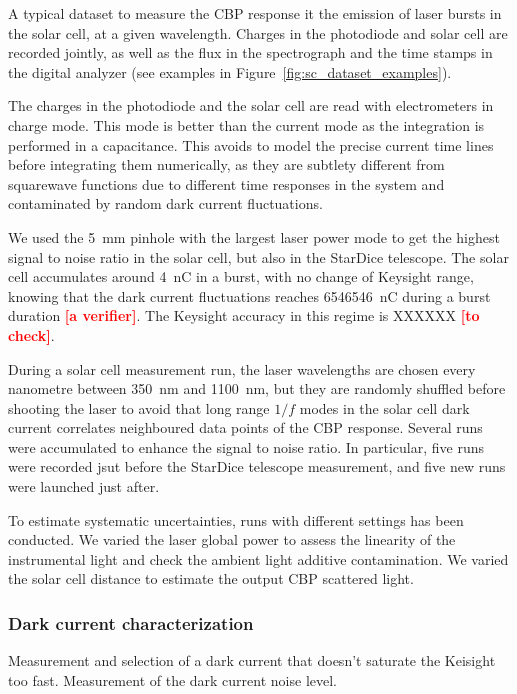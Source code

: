 \documentclass[onecolumn]{aa}
\newcommand{\SD}{StarDice }
\newcommand{\todo}[1]{\textbf{\textcolor{red}{[#1]}}\xspace}
\begin{document}
A typical dataset to measure the CBP response it the emission of laser bursts in the solar cell, at a given wavelength. Charges in the photodiode and solar cell are recorded jointly, as well as the flux in the spectrograph and the time stamps in the digital analyzer (see examples in Figure~\ref{fig:sc_dataset_examples}).

The charges in the photodiode and the solar cell are read with electrometers in charge mode. This mode is better than the current mode as the integration is performed in a capacitance. This avoids to model the precise current time lines before integrating them numerically, as they are subtlety different from squarewave functions due to different time responses in the system and contaminated by random dark current fluctuations. 

We used the \SI{5}{\mm} pinhole with the largest laser power mode to get the highest signal to noise ratio in the solar cell, but also in the \SD telescope. The solar cell accumulates around \SI{4}{\nano\coulomb} in a burst, with no change of Keysight range, knowing that the dark current fluctuations reaches \SI{6546546}{\nano\coulomb} during a burst duration \todo{a verifier}. The Keysight accuracy in this regime is XXXXXX \todo{to check}. 


During a solar cell measurement run, the laser wavelengths are chosen every nanometre between \SI{350}{\nano\meter} and \SI{1100}{\nano\meter}, but they are randomly shuffled before shooting the laser to avoid that long range $1/f$ modes in the solar cell dark current correlates neighboured data points of the CBP response. Several runs were accumulated to enhance the signal to noise ratio. In particular, five runs were recorded jsut before the \SD telescope measurement, and five new runs were launched just after.


To estimate systematic uncertainties, runs with different settings has been conducted. We varied the laser global power to assess the linearity of the instrumental light and check the ambient light additive contamination. We varied the solar cell distance to estimate the output CBP scattered light.


\subsubsection{Dark current characterization}

Measurement and selection of a dark current that doesn't saturate the Keisight
too fast. Measurement of the dark current noise level. 
\end{document}
